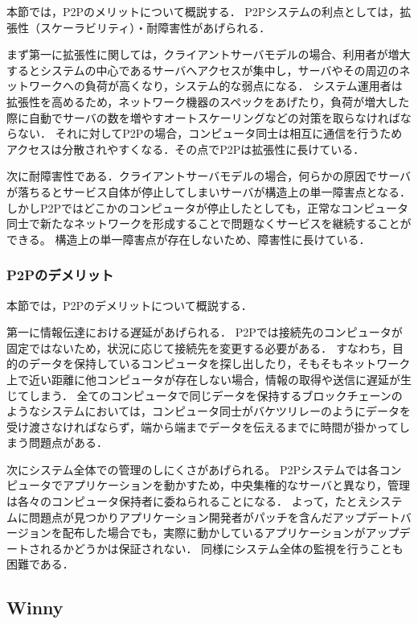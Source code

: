 本節では，P2Pのメリットについて概説する．
P2Pシステムの利点としては，拡張性（スケーラビリティ）・耐障害性があげられる．

まず第一に拡張性に関しては，クライアントサーバモデルの場合、利用者が増大するとシステムの中心であるサーバへアクセスが集中し，サーバやその周辺のネットワークへの負荷が高くなり，システム的な弱点になる．
システム運用者は拡張性を高めるため，ネットワーク機器のスペックをあげたり，負荷が増大した際に自動でサーバの数を増やすオートスケーリングなどの対策を取らなければならない．
それに対してP2Pの場合，コンピュータ同士は相互に通信を行うためアクセスは分散されやすくなる．その点でP2Pは拡張性に長けている．

次に耐障害性である．クライアントサーバモデルの場合，何らかの原因でサーバが落ちるとサービス自体が停止してしまいサーバが構造上の単一障害点となる．
しかしP2Pではどこかのコンピュータが停止したとしても，正常なコンピュータ同士で新たなネットワークを形成することで問題なくサービスを継続することができる。
構造上の単一障害点が存在しないため、障害性に長けている．

\subsubsection{P2Pのデメリット}

本節では，P2Pのデメリットについて概説する．

第一に情報伝達における遅延があげられる．
P2Pでは接続先のコンピュータが固定ではないため，状況に応じて接続先を変更する必要がある．
すなわち，目的のデータを保持しているコンピュータを探し出したり，そもそもネットワーク上で近い距離に他コンピュータが存在しない場合，情報の取得や送信に遅延が生じてしまう．
全てのコンピュータで同じデータを保持するブロックチェーンのようなシステムにおいては，コンピュータ同士がバケツリレーのようにデータを受け渡さなければならず，端から端までデータを伝えるまでに時間が掛かってしまう問題点がある．

次にシステム全体での管理のしにくさがあげられる。
P2Pシステムでは各コンピュータでアプリケーションを動かすため，中央集権的なサーバと異なり，管理は各々のコンピュータ保持者に委ねられることになる．
よって，たとえシステムに問題点が見つかりアプリケーション開発者がパッチを含んだアップデートバージョンを配布した場合でも，実際に動かしているアプリケーションがアップデートされるかどうかは保証されない．
同様にシステム全体の監視を行うことも困難である．

\subsection{Winny}

